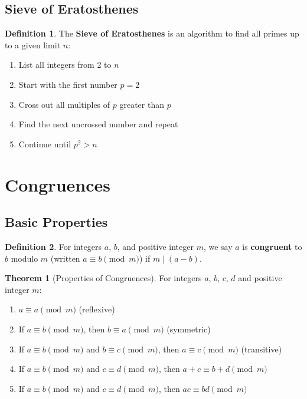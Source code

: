 \documentclass[11pt]{article}
\theoremstyle{definition}
\newtheorem{definition}{Definition}[section]
\newtheorem{theorem}{Theorem}[section]
\begin{document}
\subsection{Sieve of Eratosthenes}
\begin{definition}
The \textbf{Sieve of Eratosthenes} is an algorithm to find all primes up to a given limit $n$:
\begin{enumerate}
    \item List all integers from 2 to $n$
    \item Start with the first number $p = 2$
    \item Cross out all multiples of $p$ greater than $p$
    \item Find the next uncrossed number and repeat
    \item Continue until $p^2 > n$
\end{enumerate}
\end{definition}

\section{Congruences}

\subsection{Basic Properties}
\begin{definition}
For integers $a$, $b$, and positive integer $m$, we say $a$ is \textbf{congruent} to $b$ modulo $m$ (written $a \equiv b \pmod{m}$) if $m \mid (a - b)$.
\end{definition}

\begin{theorem}[Properties of Congruences]
For integers $a$, $b$, $c$, $d$ and positive integer $m$:
\begin{enumerate}
    \item $a \equiv a \pmod{m}$ (reflexive)
    \item If $a \equiv b \pmod{m}$, then $b \equiv a \pmod{m}$ (symmetric)
    \item If $a \equiv b \pmod{m}$ and $b \equiv c \pmod{m}$, then $a \equiv c \pmod{m}$ (transitive)
    \item If $a \equiv b \pmod{m}$ and $c \equiv d \pmod{m}$, then $a + c \equiv b + d \pmod{m}$
    \item If $a \equiv b \pmod{m}$ and $c \equiv d \pmod{m}$, then $ac \equiv bd \pmod{m}$
\end{enumerate}
\end{theorem}
\end{document}
